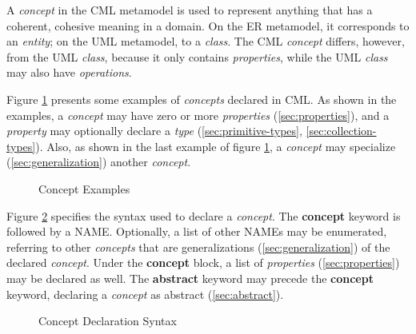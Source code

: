 A \emph{concept} in the CML metamodel is used to represent anything
that has a coherent, cohesive meaning in a domain.
On the ER \cite{er} metamodel,
it corresponds to an \emph{entity};
on the UML \cite{uml} metamodel,
to a \emph{class}.
The CML \emph{concept} differs, however, from the UML \emph{class},
because it only contains \emph{properties},
while the UML \emph{class} may also have \emph{operations}.

Figure \ref{fig:ex:concepts} presents some examples of \emph{concepts} declared in CML.
As shown in the examples,
a \emph{concept} may have zero or more \emph{properties}
(\ref{sec:properties}),
and a \emph{property} may optionally declare a \emph{type}
(\ref{sec:primitive-types}, \ref{sec:collection-types}).
Also, as shown in the last example of figure \ref{fig:ex:concepts},
a \emph{concept} may specialize
(\ref{sec:generalization})
another \emph{concept}.

\begin{figure}
\verbatimfont{\small}
\begin{framed}

\end{framed}
\caption{Concept Examples}
\label{fig:ex:concepts}
\end{figure}

Figure \ref{fig:stx:concept} specifies the syntax used
to declare a \emph{concept}.
The \textbf{concept} keyword is followed by a NAME.
Optionally, a list of other NAMEs may be enumerated,
referring to other \emph{concepts}
that are generalizations (\ref{sec:generalization}) of the declared \emph{concept}.
Under the \textbf{concept} block,
a list of \emph{properties} (\ref{sec:properties}) may be declared as well.
The \textbf{abstract} keyword may precede the \textbf{concept} keyword, declaring a \emph{concept} as abstract (\ref{sec:abstract}).

\begin{figure}
\verbatimfont{\small}
\begin{framed}

\end{framed}
\caption{Concept Declaration Syntax}
\label{fig:stx:concept}
\end{figure}
